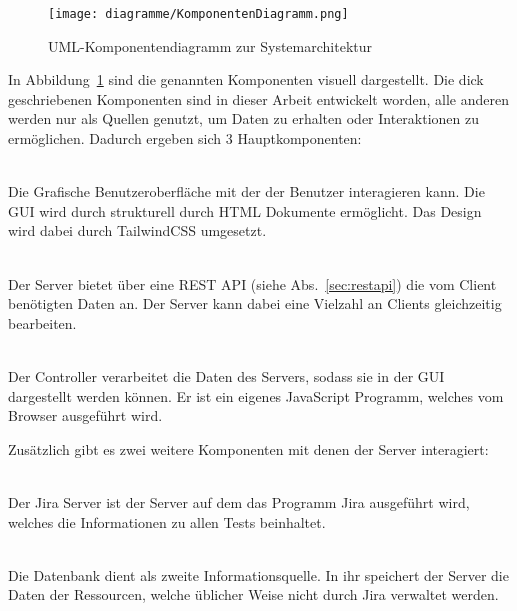 \begin{figure}[H]
    \texttt{[image: diagramme/KomponentenDiagramm.png]}
    \caption{UML-Komponentendiagramm zur Systemarchitektur}\label{fig:components}
\end{figure}

In Abbildung~\ref{fig:components} sind die genannten Komponenten visuell dargestellt.
Die dick geschriebenen Komponenten sind in dieser Arbeit entwickelt worden, alle
anderen werden nur als Quellen genutzt, um Daten zu erhalten oder Interaktionen zu 
ermöglichen. Dadurch ergeben sich 3 Hauptkomponenten:

\begin{description}
    \hfill\\
    Die Grafische Benutzeroberfläche mit der der Benutzer interagieren kann.
    Die \gls{GUI} wird durch strukturell durch \gls{HTML} Dokumente ermöglicht. 
    Das Design wird dabei durch TailwindCSS umgesetzt.

    \hfill\\
    Der Server bietet über eine \gls{REST} \gls{API} (siehe Abs.~\ref{sec:restapi})
    die vom Client benötigten Daten an. Der Server kann dabei eine Vielzahl an Clients
    gleichzeitig bearbeiten.

    \hfill\\
    Der Controller verarbeitet die Daten des Servers, sodass sie in der GUI
    dargestellt werden können. Er ist ein eigenes JavaScript Programm,
    welches vom Browser ausgeführt wird.\\
\end{description}

Zusätzlich gibt es zwei weitere Komponenten mit denen der Server interagiert:

\begin{description}
    \hfill\\
    Der \gls{Jira} Server ist der Server auf dem das Programm \gls{Jira} ausgeführt wird, 
    welches die Informationen zu allen Tests beinhaltet.

    \hfill\\
    Die Datenbank dient als zweite Informationsquelle. In ihr speichert der Server
    die Daten der Ressourcen, welche üblicher Weise nicht durch \gls{Jira} verwaltet
    werden.
\end{description}

